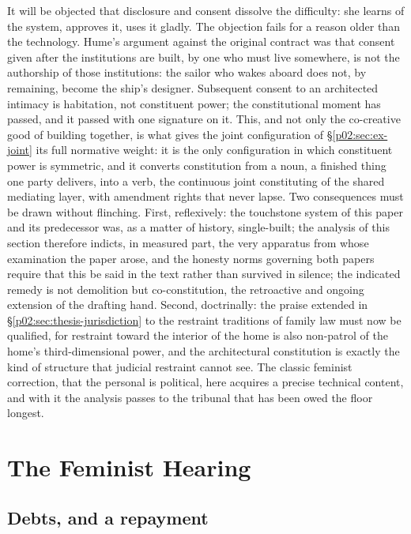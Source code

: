 \documentclass[11pt,a4paper]{article}
\begin{document}
It will be objected that disclosure and consent dissolve the difficulty: she learns of the system, approves it, uses it gladly. The objection fails for a reason older than the technology. Hume's argument against the original contract \parencite{hume1748original} was that consent given after the institutions are built, by one who must live somewhere, is not the authorship of those institutions: the sailor who wakes aboard does not, by remaining, become the ship's designer. Subsequent consent to an architected intimacy is habitation, not constituent power; the constitutional moment has passed, and it passed with one signature on it. This, and not only the co-creative good of building together, is what gives the joint configuration of \S\ref{p02:sec:ex-joint} its full normative weight: it is the only configuration in which constituent power is symmetric, and it converts constitution from a noun, a finished thing one party delivers, into a verb, the continuous joint constituting of the shared mediating layer, with amendment rights that never lapse. Two consequences must be drawn without flinching. First, reflexively: the touchstone system of this paper and its predecessor was, as a matter of history, single-built; the analysis of this section therefore indicts, in measured part, the very apparatus from whose examination the paper arose, and the honesty norms governing both papers require that this be said in the text rather than survived in silence; the indicated remedy is not demolition but co-constitution, the retroactive and ongoing extension of the drafting hand. Second, doctrinally: the praise extended in \S\ref{p02:sec:thesis-jurisdiction} to the restraint traditions of family law must now be qualified, for restraint toward the interior of the home is also non-patrol of the home's third-dimensional power, and the architectural constitution is exactly the kind of structure that judicial restraint cannot see. The classic feminist correction, that the personal is political, here acquires a precise technical content, and with it the analysis passes to the tribunal that has been owed the floor longest.

\section{The Feminist Hearing}
\label{p02:sec:feminism}

\subsection{Debts, and a repayment}
\label{p02:sec:fem-debts}
\end{document}
